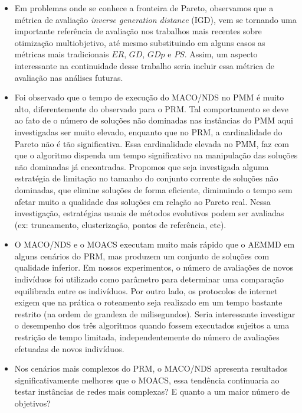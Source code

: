 \begin{itemize}
	\item Em problemas onde se conhece a fronteira de Pareto, observamos que a métrica de avaliação \textit{inverse generation distance} (IGD), vem se tornando uma importante referência de avaliação nos trabalhos mais recentes sobre otimização multiobjetivo, até mesmo substituindo em alguns casos as métricas mais tradicionais $ER$, $GD$, $GDp$ e $PS$. Assim, um aspecto interessante na continuidade desse trabalho seria incluir essa métrica de avaliação nas análises futuras.
	
	\item Foi observado que o tempo de execução do MACO/NDS no PMM é muito alto, diferentemente do observado para o PRM. Tal comportamento se deve ao fato de o número de soluções não dominadas nas instâncias do PMM aqui investigadas ser muito elevado, enquanto que no PRM, a cardinalidade do Pareto não é tão significativa. Essa cardinalidade elevada no PMM, faz com que o algoritmo dispenda um tempo significativo na manipulação das soluções não dominadas já encontradas. Propomos que seja investigada alguma estratégia de limitação no tamanho do conjunto corrente de soluções não dominadas, que elimine soluções de forma eficiente, diminuindo o tempo sem afetar muito a qualidade das soluções em relação ao Pareto real. Nessa investigação, estratégias usuais de métodos evolutivos podem ser avaliadas (ex: truncamento, clusterização, pontos de referência, etc).

	\item O MACO/NDS e o MOACS executam muito mais rápido que o AEMMD em alguns cenários do PRM, mas produzem um conjunto de soluções com qualidade inferior. Em nossos experimentos, o número de avaliações de novos indivíduos foi utilizado como parâmetro para determinar uma comparação equilibrada entre os indivíduos. Por outro lado, os protocolos de internet exigem que na prática o roteamento seja realizado em um tempo bastante restrito (na ordem de grandeza de milisegundos). Seria interessante investigar o desempenho dos três algoritmos quando fossem executados sujeitos a uma restrição de tempo limitada, independentemente do número de avaliações efetuadas de novos indivíduos.
	
	\item Nos cenários mais complexos do PRM, o MACO/NDS apresenta resultados significativamente melhores que o MOACS, essa tendência continuaria ao testar instâncias de redes mais complexas? E quanto a um maior número de objetivos?


\end{itemize}
